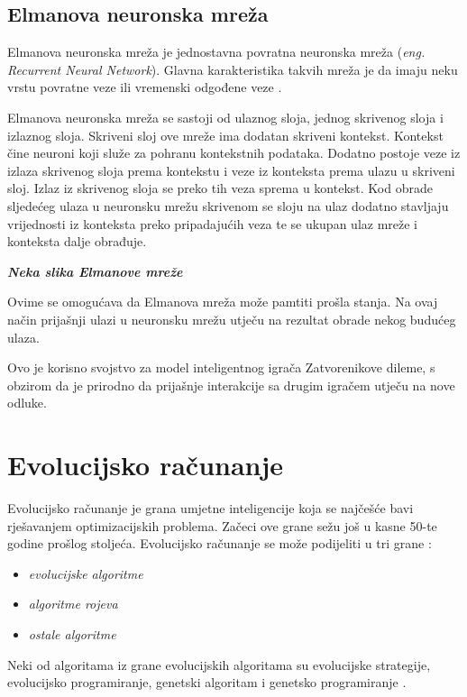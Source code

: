 \documentclass[zavrsnirad]{fer}
\begin{document}
	\section{Elmanova neuronska mreža}
	
		Elmanova neuronska mreža je jednostavna povratna neuronska mreža (\textit{eng. Recurrent Neural Network}). Glavna karakteristika takvih mreža je da imaju neku vrstu povratne veze ili vremenski odgođene veze \cite{ElmanNetSite}.
		
		Elmanova neuronska mreža se sastoji od ulaznog sloja, jednog skrivenog sloja i izlaznog sloja. Skriveni sloj ove mreže ima dodatan skriveni kontekst. Kontekst čine neuroni koji služe za pohranu kontekstnih podataka. Dodatno postoje veze iz izlaza skrivenog sloja prema kontekstu i veze iz konteksta prema ulazu u skriveni sloj. Izlaz iz skrivenog sloja se preko tih veza sprema u kontekst. Kod obrade sljedećeg ulaza u neuronsku mrežu skrivenom se sloju na ulaz dodatno stavljaju vrijednosti iz konteksta preko pripadajućih veza te se ukupan ulaz mreže i konteksta dalje obrađuje. \cite{Elman}
		
		\textit{\textbf{Neka slika Elmanove mreže}}
		
		Ovime se omogućava da Elmanova mreža može pamtiti prošla stanja. Na ovaj način prijašnji ulazi u neuronsku mrežu utječu na rezultat obrade nekog budućeg ulaza.
		
		Ovo je korisno svojstvo za model inteligentnog igrača Zatvorenikove dileme, s obzirom da je prirodno da prijašnje interakcije sa drugim igračem utječu na nove odluke.
	
\chapter{Evolucijsko računanje}

	Evolucijsko računanje je grana umjetne inteligencije koja se najčešće bavi rješavanjem optimizacijskih problema. Začeci ove grane sežu još u kasne 50-te godine prošlog stoljeća. Evolucijsko računanje se može podijeliti u tri grane \cite{skriptaEvolucijskoRacunarstvo}: 
	\begin{itemize}
		\item \textit{evolucijske algoritme}
		\item \textit{algoritme rojeva}
		\item \textit{ostale algoritme}
	\end{itemize}
	
	Neki od algoritama iz grane evolucijskih algoritama su evolucijske strategije, evolucijsko programiranje, genetski algoritam i genetsko programiranje \cite{skriptaEvolucijskoRacunarstvo}.
	
\end{document}
